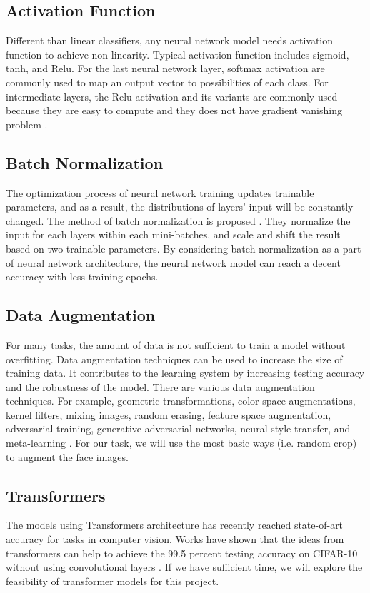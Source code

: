 \documentclass[conference]{IEEEtran}
\begin{document}
\subsection{Activation Function}
Different than linear classifiers, any neural network model needs activation function to achieve non-linearity. 
Typical activation function includes sigmoid, tanh, and Relu. For the last neural network layer, softmax activation are commonly used to map an output vector to possibilities of each class. For intermediate layers, the Relu activation and its variants are commonly used because they are easy to compute and they does not have gradient vanishing problem \cite{b7}.

\subsection{Batch Normalization}
The optimization process of neural network training updates trainable parameters, and as a result, the distributions of layers' input will be constantly changed. The method of batch normalization is proposed \cite{b8}. They normalize the input for each layers within each mini-batches, and scale and shift the result based on two trainable parameters. By considering batch normalization as a part of neural network architecture, the neural network model can reach a decent accuracy with less training epochs.

\subsection{Data Augmentation}
For many tasks, the amount of data is not sufficient to train a model without overfitting. Data augmentation techniques can be used to increase the size of training data. It contributes to the learning system by increasing testing accuracy and the robustness of the model. There are various data augmentation techniques. For example, geometric transformations, color space augmentations, kernel filters, mixing images, random erasing, feature space augmentation, adversarial training, generative adversarial networks, neural style transfer, and meta-learning \cite{b9}. For our task, we will use the most basic ways (i.e. random crop) to augment the face images.

\subsection{Transformers}
The models using Transformers architecture has recently reached state-of-art accuracy for tasks in computer vision. Works have shown that the ideas from transformers can help to achieve the 99.5 percent testing accuracy on CIFAR-10 without using convolutional layers \cite{b10}. If we have sufficient time, we will explore the feasibility of transformer models for this project.
\end{document}
